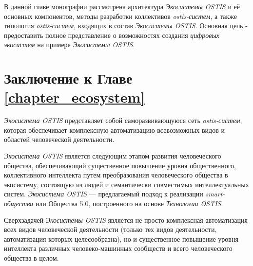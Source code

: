 В данной главе монографии рассмотрена архитектура \textit{Экосистемы OSTIS} и её основных компонентов, методы разработки коллективов \textit{ostis-систем}, а также типология \textit{ostis-систем}, входящих в состав \textit{Экосистемы OSTIS}. Основная цель - предоставить полное представление о возможностях создания \textit{цифровых экосистем} на примере \textit{Экосистемы OSTIS}.






%

\section*{Заключение к Главе \ref{chapter_ecosystem}}

\textit{Экосистема OSTIS} представляет собой саморазвивающуюся сеть \textit{ostis-систем}, которая обеспечивает комплексную автоматизацию всевозможных видов и областей человеческой деятельности. 

\textit{Экосистема OSTIS} является следующим этапом развития человеческого общества, обеспечивающий существенное повышение уровня общественного, коллективного интеллекта путем преобразования человеческого общества в экосистему, состоящую из людей и семантически совместимых интеллектуальных систем. 
\textit{Экосистема OSTIS} --- предлагаемый подход к реализации \textit{smart-общества} или Общества 5.0, построенного на основе \textit{Технологии OSTIS}.

Сверхзадачей \textit{Экосистемы OSTIS} является не просто комплексная автоматизация всех видов человеческой деятельности (только тех видов деятельности, автоматизация которых целесообразна), но и существенное повышение уровня интеллекта различных человеко-машинных сообществ и всего человеческого общества в целом.
